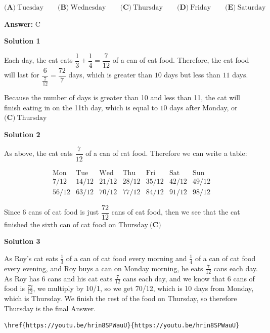 \begin{enumerate}
 $\textbf{(A)}\ \text{Tuesday}\qquad\textbf{(B)}\ \text{Wednesday}\qquad\textbf{(C)}\ \text{Thursday}\qquad\textbf{(D)}\ \text{Friday}\qquad\textbf{(E)}\ \text{Saturday}$

 \textbf{Answer: }C



\textbf{Solution 1}

Each day, the cat eats $\dfrac13+\dfrac14=\dfrac7{12}$ of a can of cat food. Therefore, the cat food will last for $\dfrac{6}{\frac7{12}}=\dfrac{72}7$ days, which is greater than $10$ days but less than $11$ days.

 
Because the number of days is greater than 10 and less than 11, the cat will finish eating in on the 11th day, which is equal to $10$ days after Monday, or $\boxed{\textbf{(C)}\ \text{Thursday}}$




\textbf{Solution 2}

As above, the cat eats $\dfrac{7}{12}$ of a can of cat food. Therefore we can write a table:

 
 \[\begin{array}{c|c|c|c|c|c|c} \text{Mon} & \text{Tue} & \text{Wed} & \text{Thu} & \text{Fri} & \text{Sat} & \text{Sun} \\ \hline 7/12 & 14/12 & 21/12 & 28/12 & 35/12 & 42/12 & 49/12 \\ 56/12 & 63/12 & 70/12 & 77/12 & 84/12 & 91/12 & 98/12 \end{array}\]

 Since $6$ cans of cat food is just $\dfrac{72}{12}$ cans of cat food, then we see that the cat finished the sixth can of cat food on $\boxed{\text{Thursday} \ \textbf{(C)}}$




\textbf{Solution 3}

As Roy's cat eats $\frac{1}{3}$ of a can of cat food every morning and $\frac{1}{4}$ of a can of cat food every evening, and Roy buys a can on Monday morning, he eats $\frac{7}{12}$ cans each day. As Roy has 6 cans and his cat eats $\frac{7}{12}$ cans each day, and we know that $6$ cans of food is $\frac{72}{12}$, we multiply by 10/1, so we get 70/12, which is 10 days from Monday, which is Thursday. We finish the rest of the food on Thursday, so therefore Thursday is the final Answer. 

 \begin{verbatim}
\href{https://youtu.be/hrin8SPWauU}{https://youtu.be/hrin8SPWauU}
\end{verbatim}






\end{enumerate}
